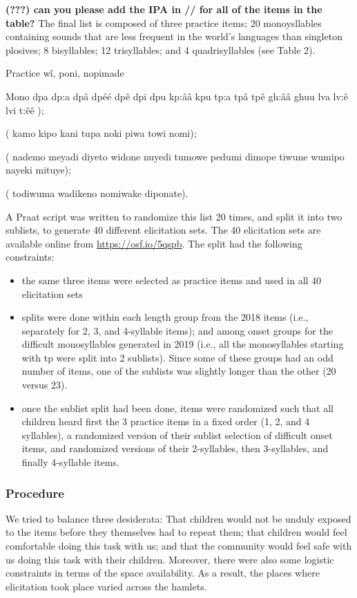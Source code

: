 \documentclass[english,,man,floatsintext]{apa6}
\providecommand{\tightlist}{%
  \setlength{\itemsep}{0pt}\setlength{\parskip}{0pt}}
\begin{document}
\textbf{({\textbf{???}}) can you please add the IPA in // for all of the items in the table?}
The final list is composed of three practice items; 20 monoysllables containing sounds that are less frequent in the world's languages than singleton plosives; 8 bisyllables; 12 trisyllables; and 4 quadrisyllables (see Table 2).

Practice
wî, poni, nopimade

Mono
dpa
dp:a
dpâ
dpéé
dpê
dpi
dpu
kp:ââ
kpu
tp:a
tpâ
tpê
gh:ââ
ghuu
lva
lv:ê
lvi
t:êê
);

(
kamo
kipo
kani
tupa
noki
piwa
towi
nomi);

(
nademo
meyadi
diyeto
widone
nuyedi
tumowe
pedumi
dimope
tiwune
wumipo
nayeki
mituye);

(
todiwuma
wadikeno
nomiwake
diponate).

A Praat script was written to randomize this list 20 times, and split it into two sublists, to generate 40 different elicitation sets. The 40 elicitation sets are available online from \url{https://osf.io/5qspb}. The split had the following constraints:

\begin{itemize}
\tightlist
\item
  the same three items were selected as practice items and used in all 40 elicitation sets
\item
  splits were done within each length group from the 2018 items (i.e., separately for 2, 3, and 4-syllable items); and among onset groups for the difficult monosyllables generated in 2019 (i.e., all the monosyllables starting with tp were split into 2 sublists). Since some of these groups had an odd number of items, one of the sublists was slightly longer than the other (20 versus 23).
\item
  once the sublist split had been done, items were randomized such that all children heard first the 3 practice items in a fixed order (1, 2, and 4 syllables), a randomized version of their sublist selection of difficult onset items, and randomized versions of their 2-syllables, then 3-syllables, and finally 4-syllable items.
\end{itemize}

\hypertarget{procedure}{%
\subsubsection{Procedure}\label{procedure}}

We tried to balance three desiderata: That children would not be unduly exposed to the items before they themselves had to repeat them; that children would feel comfortable doing this task with us; and that the community would feel safe with us doing this task with their children. Moreover, there were also some logistic constraints in terms of the space availability. As a result, the places where elicitation took place varied across the hamlets.
\end{document}
